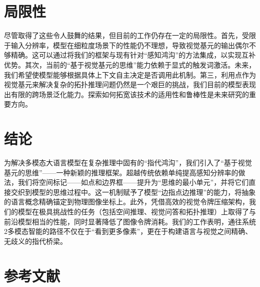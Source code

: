 \documentclass[11pt,a4paper]{article}
\begin{document}
\section{局限性}

尽管取得了这些令人鼓舞的结果，但目前的工作仍存在一定的局限性。首先，受限于输入分辨率，模型在细粒度场景下的性能仍不理想，导致视觉基元的输出偶尔不够精确。这可以通过将我们的框架与现有针对“感知鸿沟”的方法集成，以实现互补优势。其次，当前的“基于视觉基元的思维”能力依赖于显式的触发词激活。未来，我们希望使模型能够根据具体上下文自主决定是否调用此机制。第三，利用点作为视觉基元来解决复杂的拓扑推理问题仍然是一个艰巨的挑战，我们目前的模型表现出有限的跨场景泛化能力。探索如何拓宽该技术的适用性和鲁棒性是未来研究的重要方向。

\section{结论}

为解决多模态大语言模型在复杂推理中固有的“指代鸿沟”，我们引入了“基于视觉基元的思维”——一种新颖的推理框架。超越传统依赖单纯提高感知分辨率的做法，我们将空间标记——如点和边界框——提升为“思维的最小单元”，并将它们直接交织到模型的思维过程中。这一机制赋予了模型“边指点边推理”的能力，将抽象的语言概念精确锚定到物理图像坐标上。此外，凭借高效的视觉令牌压缩架构，我们的模型在极具挑战性的任务（包括空间推理、视觉问答和拓扑推理）上取得了与前沿模型相当的性能，同时显著降低了图像令牌消耗。我们的工作表明，通往系统2多模态智能的路径不仅在于“看到更多像素”，更在于构建语言与视觉之间精确、无歧义的指代桥梁。

\section*{参考文献}
\end{document}
